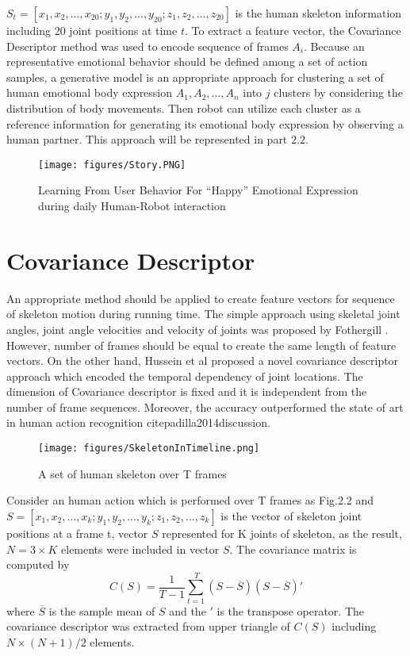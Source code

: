 $ S_t = [ x_1,x_2,...,x_{20};y_1,y_2,...,y_{20};z_1,z_2,...,z_{20} ]$ is the human skeleton information including 20 joint positions at time $t$. To extract a feature vector, the Covariance Descriptor method was used to encode sequence of frames $A_i$. Because an representative emotional behavior should be defined among a set of action samples, a generative model is an appropriate approach for clustering a set of human emotional body expression $A_1,A_2,...,A_n$ into $j$ clusters by considering the distribution of body movements. Then robot can utilize each cluster as a reference information for generating its emotional body expression by observing a human partner. This approach will be represented in part $2.2$.

\begin{figure}[t!]
	\centering
	\texttt{[image: figures/Story.PNG]}
	\caption{Learning From User Behavior For “Happy” Emotional Expression during daily Human-Robot interaction }
	\label{Story}
\end{figure}

\section{Covariance Descriptor}
\label{sec:CovarianceDescriptor}
An appropriate method should be applied to create feature vectors for sequence of skeleton motion during running time. The simple approach using skeletal joint angles, joint angle velocities and velocity of joints was proposed by Fothergill \cite{fothergill2012instructing}. However, number of frames should be equal to create the same length of feature vectors. On the other hand, Hussein et al \cite{hussein2013human} proposed a novel covariance descriptor approach which encoded the temporal dependency of joint locations. The dimension of Covariance descriptor is fixed and it is independent from the number of frame sequences. Moreover, the accuracy outperformed the state of art in human action recognition cite{padilla2014discussion}.

\begin{figure}[t!]
	\centering
	\texttt{[image: figures/SkeletonInTimeline.png]}
	\caption{A set of human skeleton over T frames }
	\label{SkeletonInTimeline}
\end{figure}

Consider an human action which is performed over T frames as Fig.2.2 and $S=[x_1,x_2,...,x_k;y_1,y_2,...,y_k;z_1,z_2,...,z_k]$ is the vector of skeleton joint positions at a frame t, vector $S$ represented for K joints of skeleton, as the result, $N=3 \times K$ elements were included in vector $S$. The covariance matrix is computed by
\begin{equation}
C(S) = \frac{1}{T-1} \sum_{t=1}^{\ T} (S- \overline{S})(S- \overline{S})'
\end{equation}
where $\overline{S}$ is the sample mean of $S$ and the $'$ is the transpose operator.
The covariance descriptor was extracted from upper triangle of $C(S)$ including $N \times (N+1)/2$ elements. 

